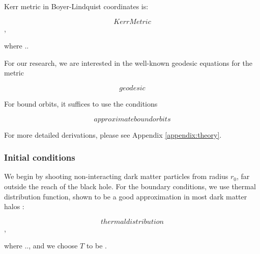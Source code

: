 \documentclass[a4paper,10pt]{article}
\begin{document}
% 
% 
% 



Kerr metric in Boyer-Lindquist coordinates is:

\begin{equation}
 KerrMetric
\end{equation},

where ..

For our research, we are interested in the well-known geodesic equations for the metric 


\begin{equation}
 geodesic
\end{equation}

For bound orbits, it suffices to use the conditions

\begin{equation}
 approximateboundorbits
\end{equation}

For more detailed derivations, please see Appendix \ref{appendix:theory}.

\subsubsection{Initial conditions}

We begin by shooting non-interacting dark matter particles from radius $r_0$, far outside the reach of the black hole. 
For the boundary conditions, we use thermal distribution function, shown to be a good approximation in most 
dark matter halos \citep{dm_halo_maxwellian}:

\begin{equation}
 thermaldistribution
\end{equation},

where .., and we choose $T$ to be \citep{should_be_known}. %
\end{document}
